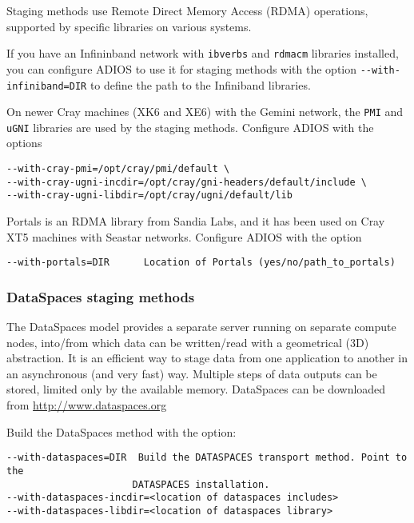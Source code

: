 Staging methods use Remote Direct Memory Access (RDMA) operations, supported by specific libraries 
on various systems. 

\vspace*{6pt}
If you have an Infininband network with \verb+ibverbs+ and \verb+rdmacm+ libraries installed, you can configure ADIOS to use it for staging methods with the option
\verb+--with-infiniband=DIR+  to define the path to the Infiniband libraries. 

\vspace*{6pt}
On newer Cray machines (XK6 and XE6) with the Gemini network, the \verb+PMI+ and \verb+uGNI+ libraries are used by the staging methods. Configure ADIOS with the options

\begin{lstlisting}
--with-cray-pmi=/opt/cray/pmi/default \
--with-cray-ugni-incdir=/opt/cray/gni-headers/default/include \
--with-cray-ugni-libdir=/opt/cray/ugni/default/lib
\end{lstlisting}

\vspace*{6pt}
Portals is an RDMA library from Sandia Labs, and it has been used on Cray XT5 machines with Seastar networks. Configure ADIOS with the option

\verb+--with-portals=DIR      Location of Portals (yes/no/path_to_portals)+

\subsubsection{DataSpaces staging methods}
The DataSpaces model provides a separate server running on separate compute nodes, into/from which data can be written/read with a geometrical (3D) abstraction. It is an efficient way to stage data from one application to another in an asynchronous (and very fast) way. Multiple steps of data outputs can be stored, limited only by the available memory. DataSpaces can be downloaded from \url{http://www.dataspaces.org}

\noindent Build the DataSpaces method with the option:

\begin{lstlisting}
--with-dataspaces=DIR  Build the DATASPACES transport method. Point to the
                      DATASPACES installation.
--with-dataspaces-incdir=<location of dataspaces includes>
--with-dataspaces-libdir=<location of dataspaces library>
\end{lstlisting}

